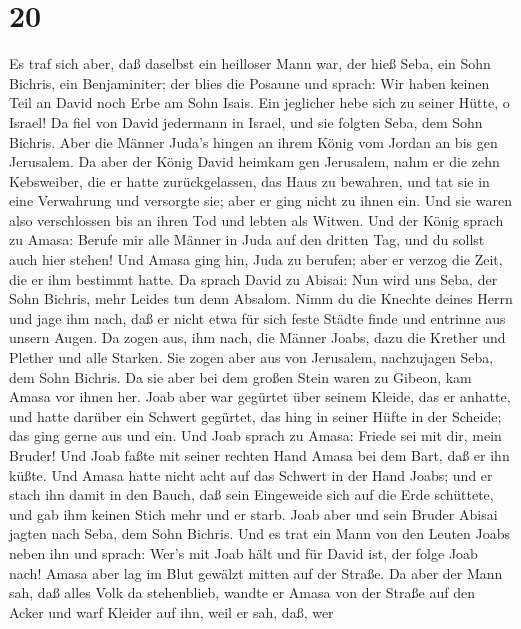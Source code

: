 \hypertarget{section-19}{%
\section{20}\label{section-19}}

 Es traf sich aber, daß daselbst ein heilloser Mann war, der
hieß Seba, ein Sohn Bichris, ein Benjaminiter; der blies die Posaune und
sprach: Wir haben keinen Teil an David noch Erbe am Sohn Isais. Ein
jeglicher hebe sich zu seiner Hütte, o Israel!  Da fiel von
David jedermann in Israel, und sie folgten Seba, dem Sohn Bichris. Aber
die Männer Juda's hingen an ihrem König vom Jordan an bis gen Jerusalem.
 Da aber der König David heimkam gen Jerusalem, nahm er die
zehn Kebsweiber, die er hatte zurückgelassen, das Haus zu bewahren, und
tat sie in eine Verwahrung und versorgte sie; aber er ging nicht zu
ihnen ein. Und sie waren also verschlossen bis an ihren Tod und lebten
als Witwen.  Und der König sprach zu Amasa: Berufe mir alle
Männer in Juda auf den dritten Tag, und du sollst auch hier stehen!
 Und Amasa ging hin, Juda zu berufen; aber er verzog die
Zeit, die er ihm bestimmt hatte.  Da sprach David zu Abisai:
Nun wird uns Seba, der Sohn Bichris, mehr Leides tun denn Absalom. Nimm
du die Knechte deines Herrn und jage ihm nach, daß er nicht etwa für
sich feste Städte finde und entrinne aus unsern Augen.  Da
zogen aus, ihm nach, die Männer Joabs, dazu die Krether und Plether und
alle Starken. Sie zogen aber aus von Jerusalem, nachzujagen Seba, dem
Sohn Bichris.  Da sie aber bei dem großen Stein waren zu
Gibeon, kam Amasa vor ihnen her. Joab aber war gegürtet über seinem
Kleide, das er anhatte, und hatte darüber ein Schwert gegürtet, das hing
in seiner Hüfte in der Scheide; das ging gerne aus und ein. 
Und Joab sprach zu Amasa: Friede sei mit dir, mein Bruder! Und Joab
faßte mit seiner rechten Hand Amasa bei dem Bart, daß er ihn küßte.
 Und Amasa hatte nicht acht auf das Schwert in der Hand
Joabs; und er stach ihn damit in den Bauch, daß sein Eingeweide sich auf
die Erde schüttete, und gab ihm keinen Stich mehr und er starb. Joab
aber und sein Bruder Abisai jagten nach Seba, dem Sohn Bichris.
 Und es trat ein Mann von den Leuten Joabs neben ihn und
sprach: Wer's mit Joab hält und für David ist, der folge Joab nach!
 Amasa aber lag im Blut gewälzt mitten auf der Straße. Da
aber der Mann sah, daß alles Volk da stehenblieb, wandte er Amasa von
der Straße auf den Acker und warf Kleider auf ihn, weil er sah, daß, wer
